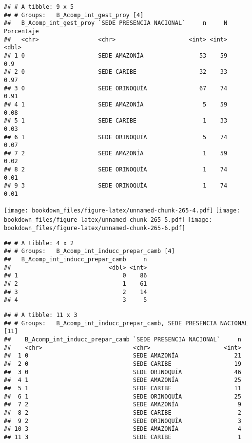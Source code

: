 \documentclass[]{article}
\theoremstyle{definition}
\theoremstyle{definition}
\theoremstyle{definition}
\theoremstyle{remark}
\begin{document}
\begin{verbatim}
## # A tibble: 9 x 5
## # Groups:   B_Acomp_int_gest_proy [4]
##   B_Acomp_int_gest_proy `SEDE PRESENCIA NACIONAL`     n     N Porcentaje
##   <chr>                 <chr>                     <int> <int>      <dbl>
## 1 0                     SEDE AMAZONÍA                53    59       0.9 
## 2 0                     SEDE CARIBE                  32    33       0.97
## 3 0                     SEDE ORINOQUÍA               67    74       0.91
## 4 1                     SEDE AMAZONÍA                 5    59       0.08
## 5 1                     SEDE CARIBE                   1    33       0.03
## 6 1                     SEDE ORINOQUÍA                5    74       0.07
## 7 2                     SEDE AMAZONÍA                 1    59       0.02
## 8 2                     SEDE ORINOQUÍA                1    74       0.01
## 9 3                     SEDE ORINOQUÍA                1    74       0.01
\end{verbatim}

\texttt{[image: bookdown\_files/figure-latex/unnamed-chunk-265-4.pdf]}
\texttt{[image: bookdown\_files/figure-latex/unnamed-chunk-265-5.pdf]}
\texttt{[image: bookdown\_files/figure-latex/unnamed-chunk-265-6.pdf]}

\begin{verbatim}
## # A tibble: 4 x 2
## # Groups:   B_Acomp_int_inducc_prepar_camb [4]
##   B_Acomp_int_inducc_prepar_camb     n
##                            <dbl> <int>
## 1                              0    86
## 2                              1    61
## 3                              2    14
## 4                              3     5
\end{verbatim}

\begin{verbatim}
## # A tibble: 11 x 3
## # Groups:   B_Acomp_int_inducc_prepar_camb, SEDE PRESENCIA NACIONAL [11]
##    B_Acomp_int_inducc_prepar_camb `SEDE PRESENCIA NACIONAL`     n
##    <chr>                          <chr>                     <int>
##  1 0                              SEDE AMAZONÍA                21
##  2 0                              SEDE CARIBE                  19
##  3 0                              SEDE ORINOQUÍA               46
##  4 1                              SEDE AMAZONÍA                25
##  5 1                              SEDE CARIBE                  11
##  6 1                              SEDE ORINOQUÍA               25
##  7 2                              SEDE AMAZONÍA                 9
##  8 2                              SEDE CARIBE                   2
##  9 2                              SEDE ORINOQUÍA                3
## 10 3                              SEDE AMAZONÍA                 4
## 11 3                              SEDE CARIBE                   1
\end{verbatim}
\end{document}
